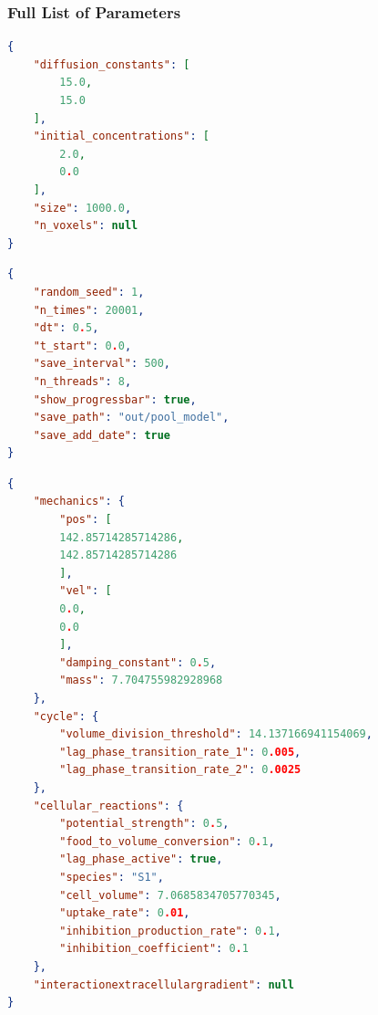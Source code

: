 \documentclass[10pt,A4paper]{article}
\numberwithin{equation}{section}
\begin{document}
\subsubsection{Full List of Parameters}
\label{sec:supplement-full-parameters}
\begin{listing}
\begin{lstlisting}[language=json]
{
    "diffusion_constants": [
        15.0,
        15.0
    ],
    "initial_concentrations": [
        2.0,
        0.0
    ],
    "size": 1000.0,
    "n_voxels": null
}
\end{lstlisting}
\caption{
    The \texttt{domain.json} file specifying initial values of the domain.
}
\end{listing}
%
\begin{listing}
\begin{lstlisting}[language=json]
{
    "random_seed": 1,
    "n_times": 20001,
    "dt": 0.5,
    "t_start": 0.0,
    "save_interval": 500,
    "n_threads": 8,
    "show_progressbar": true,
    "save_path": "out/pool_model",
    "save_add_date": true
}
\end{lstlisting}
\caption{
    The \texttt{meta\_params.json} file specifying all parameters not directly related to the simulation content.
    These settings do not represent any model-specific properties but rather generic ones such as time-span or number of threads.
}
\end{listing}
%
\begin{listing}
\begin{lstlisting}[language=json]
{
    "mechanics": {
        "pos": [
        142.85714285714286,
        142.85714285714286
        ],
        "vel": [
        0.0,
        0.0
        ],
        "damping_constant": 0.5,
        "mass": 7.704755982928968
    },
    "cycle": {
        "volume_division_threshold": 14.137166941154069,
        "lag_phase_transition_rate_1": 0.005,
        "lag_phase_transition_rate_2": 0.0025
    },
    "cellular_reactions": {
        "potential_strength": 0.5,
        "food_to_volume_conversion": 0.1,
        "lag_phase_active": true,
        "species": "S1",
        "cell_volume": 7.0685834705770345,
        "uptake_rate": 0.01,
        "inhibition_production_rate": 0.1,
        "inhibition_coefficient": 0.1
    },
    "interactionextracellulargradient": null
}
\end{lstlisting}
\caption{
    The first entry of the \texttt{initial\_cells.json} file which defines every individual particle present in the simulation initially.
}
\end{listing}
%
%
\end{document}
